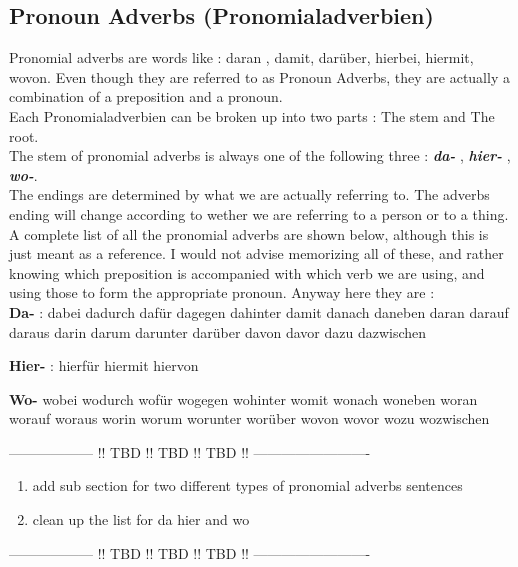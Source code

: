 \documentclass[a4paper,12pt]{article}
\begin{document}
\subsection{\bf{Pronoun Adverbs (Pronomialadverbien)}}
\begin{adjustwidth}{2em}{0pt}
\label{sec:pronoun_adverbs}

Pronomial adverbs are words like : daran , damit, darüber, hierbei, hiermit,
wovon.  Even though they are referred to as Pronoun Adverbs, they are actually a
combination of a preposition and a pronoun.\\

\noindent
Each Pronomialadverbien can be broken up into two parts : The stem and
The root.\\

\noindent The stem of pronomial adverbs is always one of the following three :
\textbf{\textit{da-}} , \textbf{\textit{hier-}} , \textbf{\textit{wo-}}.\\

\noindent The endings are determined by what we are actually referring to. The
adverbs ending will change according to wether we are referring to a person or
to a thing.\\


A complete list of all the pronomial adverbs are shown below, although this is
just meant as a reference. I would not advise memorizing all of these, and
rather knowing which preposition is accompanied with which verb we are using,
and using those to form the appropriate pronoun. Anyway here they are :\\

\textbf {Da-} : 
dabei
dadurch
dafür
dagegen
dahinter
damit
danach
daneben
daran
darauf
daraus
darin
darum
darunter
darüber
davon
davor
dazu
dazwischen

\textbf {Hier-} : 
hierfür
hiermit
hiervon

\textbf {Wo-}  
wobei
wodurch
wofür
wogegen
wohinter
womit
wonach
woneben
woran
worauf
woraus
worin
worum
worunter
worüber
wovon
wovor
wozu
wozwischen





\begin{center}
\color{red}
------------------ !! TBD !! TBD !! TBD !! -------------------------

\begin{enumerate}[noitemsep]
	\item add sub section for two different types of pronomial adverbs sentences
	\item clean up the list for da hier and wo
\end{enumerate}

------------------ !! TBD !! TBD !! TBD !! -------------------------
\color{black}
\end{center}

\end{adjustwidth}
\end{document}
